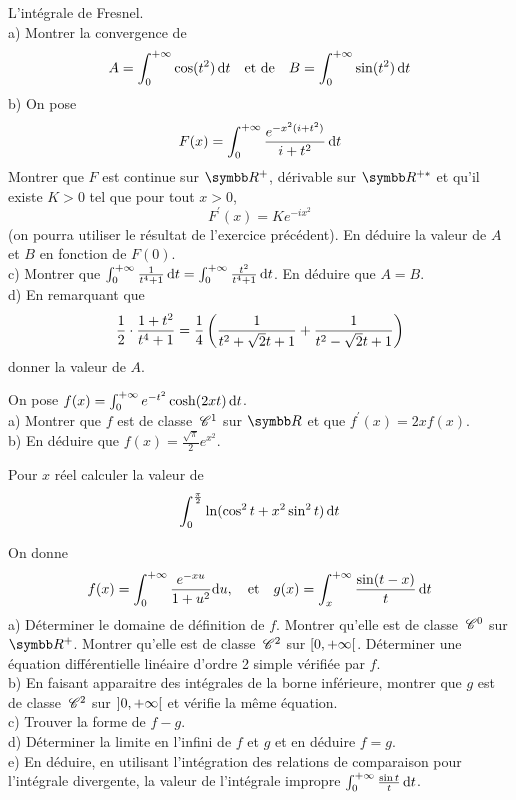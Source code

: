\begin{exercice}
L'intégrale de Fresnel. \\
a) Montrer la convergence de
$$ A=\int_{0}^{+\infty}\cos(t^{2})\,\mathrm{d}t \quad \text{et de} \quad B=\int_{0}^{+\infty}\sin(t^{2})\,\mathrm{d}t $$
b) On pose
$$ F(x)=\int_{0}^{+\infty}\frac{e^{-x^{2}(i+t^{2})}}{i+t^{2}}\,\mathrm{d}t $$
Montrer que $F$ est continue sur $\R^{+}$, dérivable sur $\R^{+*}$ et qu'il existe $K>0$ tel que pour tout $x>0$,
$$ F^{\prime}(x)=Ke^{-ix^{2}} $$
(on pourra utiliser le résultat de l'exercice précédent).
En déduire la valeur de $A$ et $B$ en fonction de $F(0)$. \\
c) Montrer que $\int_{0}^{+\infty}\frac{1}{t^{4}+1}\,\mathrm{d}t = \int_{0}^{+\infty}\frac{t^{2}}{t^{4}+1}\,\mathrm{d}t$. En déduire que $A=B$. \\
d) En remarquant que
$$ \frac{1}{2}\cdot\frac{1+t^{2}}{t^{4}+1}=\frac{1}{4}\left(\frac{1}{t^{2}+\sqrt{2}t+1}+\frac{1}{t^{2}-\sqrt{2}t+1}\right) $$
donner la valeur de $A$.
\end{exercice}

\begin{exercice}
On pose $f(x)=\int_{0}^{+\infty}e^{-t^{2}}\cosh(2xt)\,\mathrm{d}t$. \\
a) Montrer que $f$ est de classe $\,\mathscr C^{1}$ sur $\R$ et que $f^{\prime}(x)=2xf(x)$. \\
b) En déduire que $f(x)=\frac{\sqrt{\pi}}{2}e^{x^{2}}$.
\end{exercice}

\begin{exercice}
Pour $x$ réel calculer la valeur de
$$ \int_{0}^{\frac{\pi}{2}}\ln(\cos^{2}t+x^{2}\sin^{2}t)\,\mathrm{d}t $$
\end{exercice}

\begin{exercice}
On donne
$$ f(x)=\int_{0}^{+ \infty}\frac{e^{-xu}}{1+u^{2}}\mathrm{d}u, \quad \text{et} \quad g(x)=\int_{x}^{+\infty}\frac{\sin(t-x)}{t}\,\mathrm{d}t $$
a) Déterminer le domaine de définition de $f$. Montrer qu'elle est de classe $\,\mathscr C^{0}$ sur $\R^{+}$. Montrer qu'elle est de classe $\,\mathscr C^{2}$ sur $\left[0, +\infty\right[$. Déterminer une équation différentielle linéaire d'ordre 2 simple vérifiée par $f$. \\
b) En faisant apparaitre des intégrales de la borne inférieure, montrer que $g$ est de classe $\,\mathscr C^{2}$ sur $\left]0, +\infty\right[$ et vérifie la même équation. \\
c) Trouver la forme de $f-g$. \\
d) Déterminer la limite en l'infini de $f$ et $g$ et en déduire $f=g$. \\
e) En déduire, en utilisant l'intégration des relations de comparaison pour l'intégrale divergente, la valeur de l'intégrale impropre $\int_{0}^{+\infty}\frac{\sin t}{t}\,\mathrm{d}t$.
\end{exercice}

